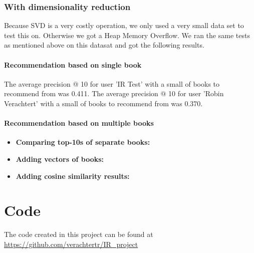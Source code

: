 \documentclass[10pt,a4paper]{paper}
\begin{document}
\subsubsection{With dimensionality reduction}
Because SVD is a very costly operation, we only used a very small data set to test this on. Otherwise we got a Heap Memory Overflow.
We ran the same tests as mentioned above on this datasat and got the following results.

\paragraph{Recommendation based on single book}

The average precision @ 10 for user 'IR Test' with a small of books to recommend from was 0.411.
The average precision @ 10 for user 'Robin Verachtert' with a small of books to recommend from was 0.370.

\paragraph{Recommendation based on multiple books}

\begin{itemize}
\item \textbf{Comparing top-10s of separate books:} %
\item \textbf{Adding vectors of books:}
\item \textbf{Adding cosine similarity results:}
\end{itemize}

\section{Code}
The code created in this project can be found at \url{https://github.com/verachtertr/IR_project}
\end{document}
